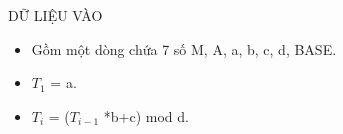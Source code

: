DỮ LIỆU VÀO
\begin{itemize}
	\item     Gồm một dòng chứa 7 số M, A, a, b, c, d, BASE.   
	\item     $T_{1}$    = a.   
	\item     $T_{i}$    = ($T_{i-1}$    *b+c) mod d.   
\end{itemize}
